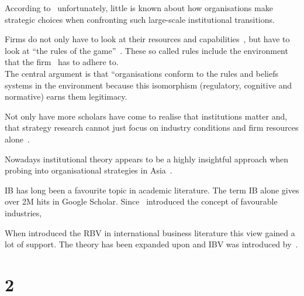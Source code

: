 According to~\cite{Peng:2003} unfortunately, little is known about how organisations make strategic choices when confronting such large-scale institutional transitions.


 Firms do not only have to look at their resources and capabilities~\cite{Barney:1991}, but have to look at ``the rules of the game''~\cite{Scott:1995}. These so called rules include the environment that the firm \mne~has to adhere to.\\




The central argument is that “organisations conform to the rules and beliefs systems in the environment because this isomorphism (regulatory, cognitive and normative) earns them legitimacy.

Not only have more scholars have come to realise that institutions matter and, that strategy research cannot just focus on industry conditions and firm resources alone~\cite{Powell:1991,Scott:1995}.

Nowadays institutional theory appears to be a highly insightful approach when probing into organisational strategies in Asia~\cite{Hoskisson:2000}.

\Gls{IB} has long been a favourite topic in academic literature. The term \gls{IB} alone gives over 2M hits in Google Scholar. Since~\cite{Porter:1980} introduced the concept of favourable industries, 

When introduced the \gls{RBV} in international business literature this view gained a lot of support. 
The theory has been expanded upon and \gls{IBV} was introduced by~\cite{Kostova:1999,Meyer:2009,Wang:2012}.


\section{2}

